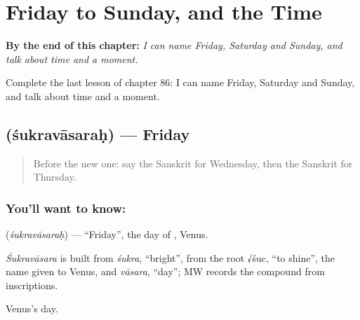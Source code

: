
\chapter{Friday to Sunday, and the Time}
\label{ch:sa-friday-to-sunday}

\begin{chapteropening}
\textbf{By the end of this chapter:} \emph{I can name Friday, Saturday and Sunday, and talk about time and a moment.}

Complete the last lesson of chapter 86: I can name Friday, Saturday and Sunday, and talk about time and a moment.
\end{chapteropening}

\section[\texorpdfstring{\sk{शुक्रवासरः} (śukravāsaraḥ)}{शुक्रवासरः (śukravāsaraḥ)}]{ (śukravāsaraḥ) — Friday}

\label{lesson:SA-C86-friday}



\begin{quote}
Before the new one: say the Sanskrit for Wednesday, then the Sanskrit for Thursday.
\end{quote}

\subsection*{You'll want to know: }
\textbf{} (\emph{śukravāsaraḥ}) — \textquotedblleft{}Friday\textquotedblright{}, the day of \textbf{}, Venus.

\begin{cousinweb}
\emph{Śukravāsara} is built from \emph{śukra}, \textquotedblleft{}bright\textquotedblright{}, from the root √śuc, \textquotedblleft{}to shine\textquotedblright{}, the name given to Venus, and \emph{vāsara}, \textquotedblleft{}day\textquotedblright{}; MW records the compound from inscriptions.
\end{cousinweb}

\begin{grammarlens}[title={What you've built}]
Venus's day.
\end{grammarlens}

